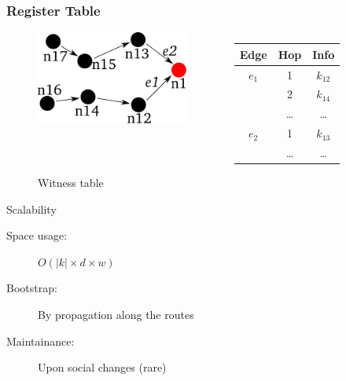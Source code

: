\documentclass{beamer}
\begin{document}

\begin{frame}

  \frametitle{Register Table}

  \begin{figure}
    \begin{columns}
      \begin{column}{5cm}
	\includegraphics[width=5cm]{./pictures/register_table} 
      \end{column}
      \begin{column}{5cm}
	\begin{center}
	  \begin{tabular}{|c|c|c|}
	    \hline
	    Edge     &  Hop     &  Info \\
	    \hline
	    \hline
	    $e_1$    &  1         &  $k_{12}$ \\
	    &  2         &  $k_{14}$ \\
	    &  \ldots    &  \ldots       \\
	    \hline
	    \hline
	    $e_2$    &  1         &  $k_{13}$ \\
	    & \ldots     &  \ldots       \\
	    \hline
	\end{tabular}
	\end{center}
      \end{column}
    \end{columns}
    \caption{Witness table}
  \end{figure}

  \begin{block}{Scalability}
    \begin{description}
    \item[Space usage:] $O( |k| \times d \times w )$
    \item[Bootstrap:] By propagation along the routes
    \item[Maintainance:] Upon social changes (rare)
    \end{description}
  \end{block}

\end{frame}
\end{document}
